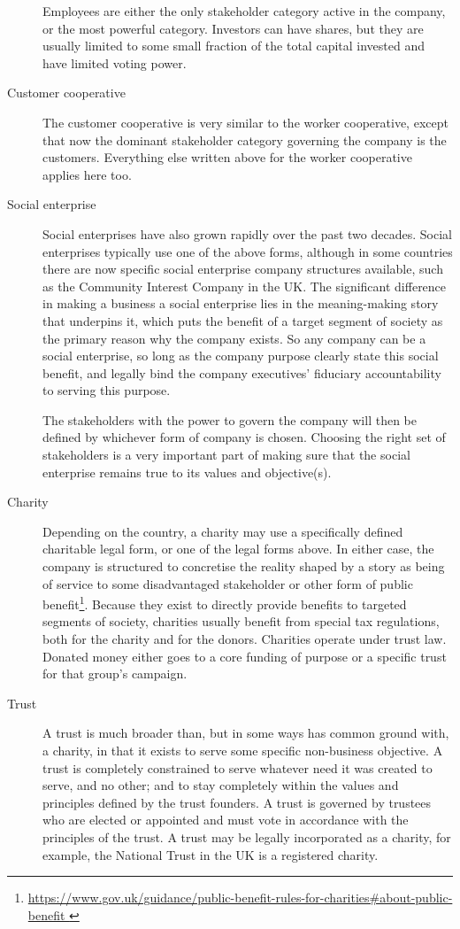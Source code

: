 \begin{description}
Employees are either the only stakeholder category active in the company, or the most powerful category. Investors can have shares, but they are usually limited to some small fraction of the total capital invested and have limited voting power.


\item[Customer cooperative]
The customer cooperative is very similar to the worker cooperative, except that now the dominant stakeholder category governing the company is the customers. Everything else written above for the worker cooperative applies here too.


\item[Social enterprise]
Social enterprises have also grown rapidly over the past two decades. Social enterprises typically use one of the above forms, although in some countries there are now specific social enterprise company structures available, such as the Community Interest Company in the UK. The significant difference in making a business a social enterprise lies in the meaning\hyp{}making story that underpins it, which puts the benefit of a target segment of society as the primary reason why the company exists. So any company can be a social enterprise, so long as the company purpose clearly state this social benefit, and legally bind the company executives’ fiduciary accountability to serving this purpose.


The stakeholders with the power to govern the company will then be defined by whichever form of company is chosen. Choosing the right set of stakeholders is a very important part of making sure that the social enterprise remains true to its values and objective(s).


\item[Charity]
Depending on the country, a charity may use a specifically defined charitable legal form, or one of the legal forms above. In either case, the company is structured to concretise the reality shaped by a story as being of service to some disadvantaged stakeholder or other form of public benefit\footnote{\url{https://www.gov.uk/guidance/public-benefit-rules-for-charities\#about-public-benefit }}. Because they exist to directly provide benefits to targeted segments of society, charities usually benefit from special tax regulations, both for the charity and for the donors. Charities operate under trust law. Donated money either goes to a core funding of purpose or a specific trust for that group's campaign.


\item[Trust]  
A trust is much broader than, but in some ways has common ground with, a charity, in that it exists to serve some specific non-business objective. A trust is completely constrained to serve whatever need it was created to serve, and no other; and to stay completely within the values and principles defined by the trust founders. A trust is governed by trustees who are elected or appointed and must vote in accordance with the principles of the trust. A trust may be legally incorporated as a charity, for example, the National Trust in the UK is a registered charity. 


\end{description}


